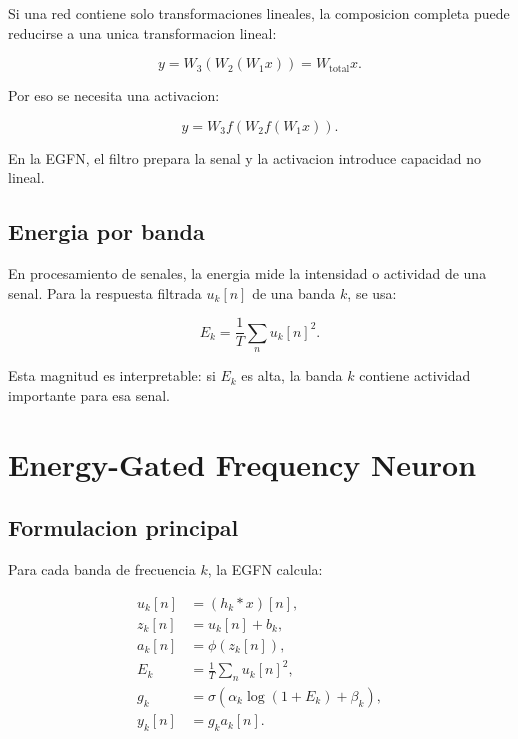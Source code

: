 \documentclass[11pt,letterpaper]{article}
\begin{document}
Si una red contiene solo transformaciones lineales, la composicion completa
puede reducirse a una unica transformacion lineal:

\begin{equation}
    y = W_3(W_2(W_1x)) = W_{\text{total}}x.
\end{equation}

Por eso se necesita una activacion:

\begin{equation}
    y = W_3 f(W_2 f(W_1x)).
\end{equation}

En la EGFN, el filtro prepara la senal y la activacion introduce capacidad no
lineal.

\subsection{Energia por banda}

En procesamiento de senales, la energia mide la intensidad o actividad de una
senal. Para la respuesta filtrada $u_k[n]$ de una banda $k$, se usa:

\begin{equation}
    E_k = \frac{1}{T}\sum_n u_k[n]^2.
\end{equation}

Esta magnitud es interpretable: si $E_k$ es alta, la banda $k$ contiene
actividad importante para esa senal.

\section{Energy-Gated Frequency Neuron}

\subsection{Formulacion principal}

Para cada banda de frecuencia $k$, la EGFN calcula:

\begin{align}
    u_k[n] &= (h_k * x)[n], \\
    z_k[n] &= u_k[n] + b_k, \\
    a_k[n] &= \phi(z_k[n]), \\
    E_k &= \frac{1}{T}\sum_n u_k[n]^2, \\
    g_k &= \sigma(\alpha_k \log(1 + E_k) + \beta_k), \\
    y_k[n] &= g_k a_k[n].
\end{align}
\end{document}

